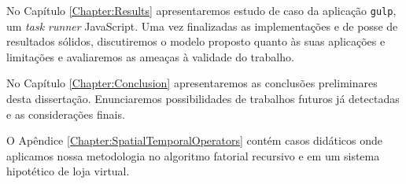 No Capítulo \ref{Chapter:Results} apresentaremos estudo de caso da aplicação
\texttt{gulp}, um \textit{task runner} JavaScript.
Uma vez finalizadas as implementações e de posse de resultados sólidos, 
discutiremos o modelo proposto quanto às suas aplicações e limitações e
avaliaremos as ameaças à validade do trabalho.

No Capítulo \ref{Chapter:Conclusion} apresentaremos as conclusões preliminares
desta dissertação. Enunciaremos possibilidades de trabalhos futuros já
detectadas e as considerações finais.

O Apêndice \ref{Chapter:SpatialTemporalOperators} contém casos didáticos onde
aplicamos nossa metodologia no algoritmo fatorial recursivo e em um sistema
hipotético de loja virtual.
